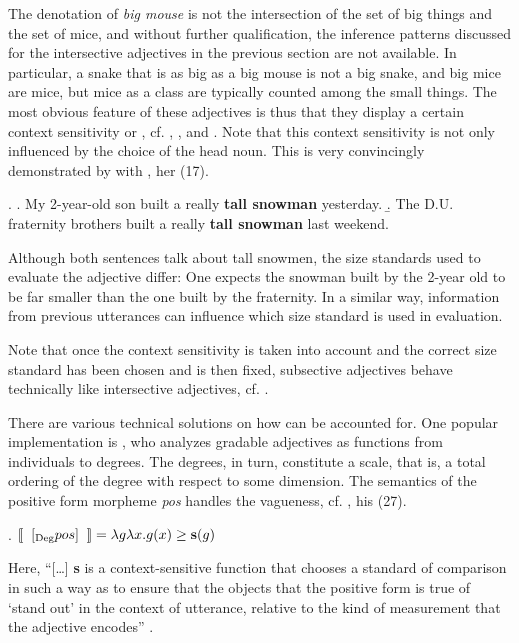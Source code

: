 The denotation of \emph{big mouse} is not the intersection of the set
of big things and the set of mice, and without further qualification, the inference patterns
discussed for the intersective adjectives in the previous section are
not available. In particular, a snake that is as big as a big mouse
is not a big snake, and big mice are mice, but mice as a class
are typically counted among the small things. The most obvious feature
of these adjectives is thus that they display a certain
context sensitivity or , cf. \citet{Kamp:1975}, \citet{Partee:1995}, \citet{HeimandKratzer:1998} and
\citet{Chierchiaetal:2000}. Note that this context sensitivity is
not only influenced by the choice of the head noun. This is very
convincingly demonstrated by \citet{Partee:1995} with \Next, her (17). 

\ex. \a. My 2-year-old son built a really \textbf{tall snowman} yesterday.
\b. The D.U. fraternity brothers built a really \textbf{tall snowman} last weekend.

Although both sentences talk about tall snowmen, the size standards used
to evaluate the adjective differ: One expects the snowman
built by the 2-year old to be far smaller than the one built by the fraternity.
In a similar way, information from previous utterances can influence
which size standard is used in evaluation.

Note that once the context sensitivity is taken into account and the
correct size standard has been chosen and is then fixed,
subsective adjectives behave technically like intersective adjectives,
cf. \citet[330--336]{Partee:1995}.

There are various technical solutions on how  can be accounted for. One
popular implementation is \citet{Kennedy:2007}, who analyzes gradable adjectives as
functions from individuals to degrees. The degrees, in turn, constitute a
scale, that is, a total ordering of the degree with respect to some dimension.
 The semantics of the
positive form morpheme \emph{pos} handles the vagueness, cf. \Next, his (27).

\ex. $[\![\;\; [_{\text{Deg}} pos]\;\;]\!] = \lambda g \lambda x.g(x) \geq \text{\textbf{s}}(g)$

Here, ``[\dots ] \textbf{s} is a context-sensitive function that chooses a
standard of comparison in such a way as to ensure that the objects
that the positive form is true of `stand out' in the context of
utterance, relative to the kind of measurement that the adjective
encodes'' \citep[17]{Kennedy:2007}.


